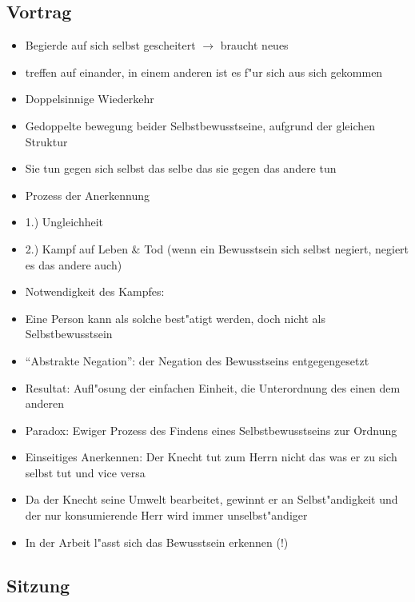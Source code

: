\documentclass[emulatestandardclasses]{scrartcl}
\begin{document}
\subsection{Vortrag}

\begin{itemize}
  \item Begierde auf sich selbst gescheitert $\rightarrow$ braucht neues
  \item treffen auf einander, in einem anderen ist es f"ur sich aus sich gekommen
  \item Doppelsinnige Wiederkehr
  \item Gedoppelte bewegung beider Selbstbewusstseine, aufgrund der gleichen Struktur
  \item Sie tun gegen sich selbst das selbe das sie gegen das andere tun
  \item Prozess der Anerkennung 
  \item 1.) Ungleichheit
  \item 2.) Kampf auf Leben \& Tod (wenn ein Bewusstsein sich selbst negiert, negiert es das andere auch)
  \item Notwendigkeit des Kampfes: 
  \item Eine Person kann als solche best"atigt werden, doch nicht als Selbstbewusstsein
  \item "`Abstrakte Negation"': der Negation des Bewusstseins entgegengesetzt
  \item Resultat: Aufl"osung der einfachen Einheit, die Unterordnung des einen dem anderen
  \item Paradox: Ewiger Prozess des Findens eines Selbstbewusstseins zur Ordnung
  \item Einseitiges Anerkennen: Der Knecht tut zum Herrn nicht das was er zu sich selbst tut und vice versa
  \item Da der Knecht seine Umwelt bearbeitet, gewinnt er an Selbst"andigkeit und der nur konsumierende Herr wird immer unselbst"andiger
  \item In der Arbeit l"asst sich das Bewusstsein erkennen (!)
\end{itemize}


\subsection{Sitzung}
\end{document}

